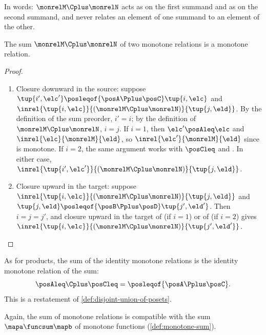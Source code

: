 In words: $\monrelM \Cplus \monrelN$ acts as \monrelM on the first summand and as \monrelN on the second summand, and never relates an element of one summand to an element of the other.

\begin{lemma}
    \label{lem:monrel-sum}
    The sum $\monrelM \Cplus \monrelN$ of two monotone relations is a monotone relation.
\end{lemma}
\begin{proof}
    \begin{enumerate}
        \item Closure downward in the source: suppose $\tup{i', \elc'} \posleqof{\posA \Pplus \posC} \tup{i, \elc}$ and $\inrel{\tup{i, \elc}}{(\monrelM \Cplus \monrelN)}{\tup{j, \eld}}$.
              By the definition of the sum preorder, $i' = i$; by the definition of $\monrelM \Cplus \monrelN$, $i = j$.
              If $i = 1$, then $\elc' \posAleq \elc$ and $\inrel{\elc}{\monrelM}{\eld}$, so $\inrel{\elc'}{\monrelM}{\eld}$ since \monrelM is monotone.
              If $i = 2$, the same argument works with $\posCleq$ and \monrelN.
              In either case, $\inrel{\tup{i', \elc'}}{(\monrelM \Cplus \monrelN)}{\tup{j, \eld}}$.
        \item Closure upward in the target: suppose $\inrel{\tup{i, \elc}}{(\monrelM \Cplus \monrelN)}{\tup{j, \eld}}$ and $\tup{j, \eld} \posleqof{\posB \Pplus \posD} \tup{j', \eld'}$.
              Then $i = j = j'$, and closure upward in the target of \monrelM (if $i = 1$) or of \monrelN (if $i = 2$) gives $\inrel{\tup{i, \elc}}{(\monrelM \Cplus \monrelN)}{\tup{j', \eld'}}$.
    \end{enumerate}
\end{proof}

\begin{example}
    As for products, the sum of the identity monotone relations is the identity monotone relation of the sum:
    \begin{equation}
        \posAleq \Cplus \posCleq = \posleqof{\posA \Pplus \posC}.
    \end{equation}
    This is a restatement of \cref{def:disjoint-union-of-posets}.
\end{example}

Again, the sum of monotone relations is compatible with the sum $\mapa \funcsum \mapb$ of monotone functions (\cref{def:monotone-sum}).

